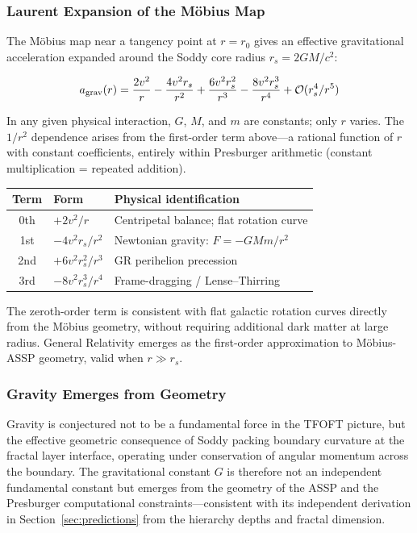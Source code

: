 \documentclass[11pt,a4paper]{article}
\begin{document}
\subsubsection{Laurent Expansion of the Möbius Map}

The Möbius map near a tangency point at $r = r_0$ gives an effective gravitational acceleration expanded around the Soddy core radius $r_s = 2GM/c^2$:

\begin{equation}
a_{\rm grav}(r) = \frac{2v^2}{r}
  - \frac{4v^2 r_s}{r^2}
  + \frac{6v^2 r_s^2}{r^3}
  - \frac{8v^2 r_s^3}{r^4}
  + \mathcal{O}(r_s^4/r^5)
\label{eq:laurent}
\end{equation}

In any given physical interaction, $G$, $M$, and $m$ are constants; only $r$ varies. The $1/r^2$ dependence arises from the first-order term above---a rational function of $r$ with constant coefficients, entirely within Presburger arithmetic (constant multiplication = repeated addition).

\begin{table}[h]
\centering
\begin{tabular}{|c|l|l|}
\hline
\textbf{Term} & \textbf{Form} & \textbf{Physical identification} \\
\hline
0th & $+2v^2/r$          & Centripetal balance; flat rotation curve \\
1st & $-4v^2 r_s/r^2$    & Newtonian gravity: $F = -GMm/r^2$ \\
2nd & $+6v^2 r_s^2/r^3$  & GR perihelion precession \\
3rd & $-8v^2 r_s^3/r^4$  & Frame-dragging / Lense--Thirring \\
\hline
\end{tabular}
\end{table}

The zeroth-order term is consistent with flat galactic rotation curves directly from the Möbius geometry, without requiring additional dark matter at large radius. General Relativity emerges as the first-order approximation to Möbius-ASSP geometry, valid when $r \gg r_s$.

\subsubsection{Gravity Emerges from Geometry}

Gravity is conjectured not to be a fundamental force in the TFOFT picture, but the effective geometric consequence of Soddy packing boundary curvature at the fractal layer interface, operating under conservation of angular momentum across the boundary. The gravitational constant $G$ is therefore not an independent fundamental constant but emerges from the geometry of the ASSP and the Presburger computational constraints---consistent with its independent derivation in Section~\ref{sec:predictions} from the hierarchy depths and fractal dimension.
\end{document}
